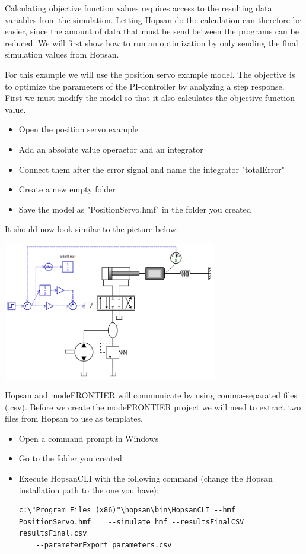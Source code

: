 \documentclass[a4paper]{article}
\begin{document}
Calculating objective function values requires access to the resulting data variables from the simulation. Letting Hopsan do the calculation can therefore be easier, since the amount of data that must be send between the programs can be reduced. We will first show how to run an optimization by only sending the final simulation values from Hopsan.

\begin{tutenumerate}
For this example we will use the position servo example model. The objective is to optimize the parameters of the PI-controller by analyzing a step response. First we must modify the model so that it also calculates the objective function value.

\begin{itemize}
\item Open the position servo example
\item Add an absolute value operaetor and an integrator
\item Connect them after the error signal and name the integrator "totalError"
\item Create a new empty folder
\item Save the model as "PositionServo.hmf" in the folder you created
\end{itemize}

It should now look similar to the picture below:

\begin{center}
\includegraphics[width=0.7\textwidth]{gfx/modefrontier/hopsanmodel.png}\\
\end{center}

Hopsan and modeFRONTIER will communicate by using comma-separated files (.csv). Before we create the modeFRONTIER project we will need to extract two files from Hopsan to use as templates.
\begin{itemize}
\item Open a command prompt in Windows
\item Go to the folder you created
\item Execute HopsanCLI with the following command (change the Hopsan installation path to the one you have):
\begin{lstlisting}[basicstyle=\ttfamily\footnotesize, breaklines=true]
c:\"Program Files (x86)"\hopsan\bin\HopsanCLI --hmf PositionServo.hmf    --simulate hmf --resultsFinalCSV resultsFinal.csv 
    --parameterExport parameters.csv
\end{lstlisting}
\end{itemize}


\end{tutenumerate}
\end{document}
